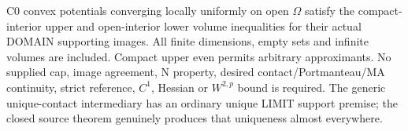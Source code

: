 \begin{lemma}
  \label{lem:domain-ma-stability}
  \leanok
  C0 convex potentials converging locally uniformly on open $\Omega$ satisfy
  the compact-interior upper and open-interior lower volume inequalities for
  their actual DOMAIN supporting images. All finite dimensions, empty sets
  and infinite volumes are included. Compact upper even permits arbitrary
  approximants. No supplied cap, image agreement, N property, desired
  contact/Portmanteau/MA continuity, strict reference, $C^1$, Hessian or
  $W^{2,p}$ bound is required. The generic unique-contact intermediary has
  an ordinary unique LIMIT support premise; the closed source theorem
  genuinely produces that uniqueness almost everywhere.
\end{lemma}
